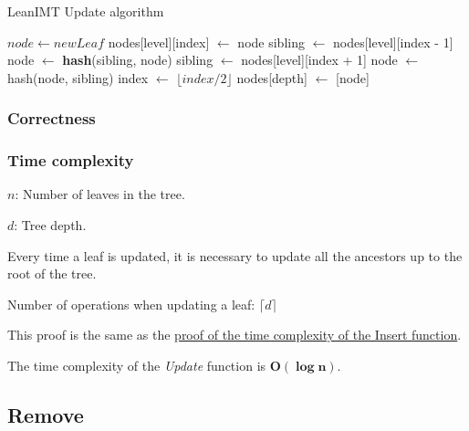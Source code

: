 \documentclass{article}
\begin{document}
\begin{algorithm}[H]
    \caption{LeanIMT Update algorithm}\label{update}
    \begin{algorithmic}[1]
        \State $node\gets newLeaf$
        \State nodes[level][index] $\gets$ node
         
        \State sibling $\gets$ nodes[level][index - 1]
        \State node $\gets$ \textbf{hash}(sibling, node)
        \Else {}
        \State sibling $\gets$ nodes[level][index + 1]
         
        \State node $\gets$ hash(node, sibling)
        \EndIf
        \EndIf
        \State index $\gets$ $\lfloor index/2 \rfloor$ 
        \EndFor
        \State nodes[depth] $\gets$ [node] 
        \EndProcedure
    \end{algorithmic}
\end{algorithm}



\subsubsection{Correctness}



\subsubsection{Time complexity}



$n$: Number of leaves in the tree.

$d$: Tree depth.



Every time a leaf is updated, it is necessary to update all the ancestors up to the root of the tree.



Number of operations when updating a leaf: $\lceil d \rceil$

This proof is the same as the \hyperref[InsertProof]{proof of the time complexity of the Insert function}.

The time complexity of the \textit{Update} function is $\boldsymbol{O(\log n)}$.



\subsection{Remove}
\end{document}
